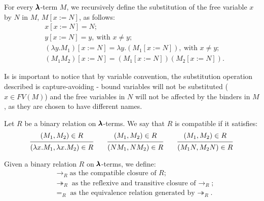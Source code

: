 \begin{definition}[Substitution]
  For every $\pmb{\lambda}$-term $M$, we recursively define the substitution of the free variable $x$ by $N$ in $M$, $M[x := N]$, as follows:
  \begin{align*}
    & x[x := N] = N; \\
    & y[x := N] = y, \ \text{with $x \neq y$}; \\
    & (\lambda y . M_1)[x := N] = \lambda y . (M_1[x := N]), \ \text{with $x \neq y$}; \\
    & (M_1 M_2)[x := N] = (M_1[x := N]) (M_2[x := N]).
  \end{align*}
\end{definition}


\begin{remark}
  Is is important to notice that by variable convention, the substitution operation described is capture-avoiding
  - bound variables will not be substituted ($x \in FV(M)$) and the free variables in $N$ will not be affected by the binders in $M$, as they are chosen to have different names. 
\end{remark}


\begin{definition}
  Let $R$ be a binary relation on $\pmb{\lambda}$-terms.
  We say that $R$ is compatible if it satisfies:
  \[
    \begin{prooftree}
      \hypo{ (M_1, M_2) \in R }
      \infer1{ (\lambda x . M_1, \lambda x . M_2) \in R } 
    \end{prooftree}
    \qquad
    \begin{prooftree}
      \hypo{ (M_1, M_2) \in R }
      \infer1{ (N M_1, N M_2) \in R } 
    \end{prooftree}
    \qquad
    \begin{prooftree}
      \hypo{ (M_1, M_2) \in R }
      \infer1{ (M_1 N, M_2 N) \in R }
    \end{prooftree}
  \]
\end{definition}


\begin{notation}
  Given a binary relation $R$ on $\pmb{\lambda}$-terms, we define:
  \begin{align*}
    & \to_R \text{as the compatible closure of $R$} ; \\
    & \twoheadrightarrow_R \text{as the reflexive and transitive closure of $\to_R$} ; \\
    & =_R \text{as the equivalence relation generated by $\twoheadrightarrow_R$}.
  \end{align*}
\end{notation}


